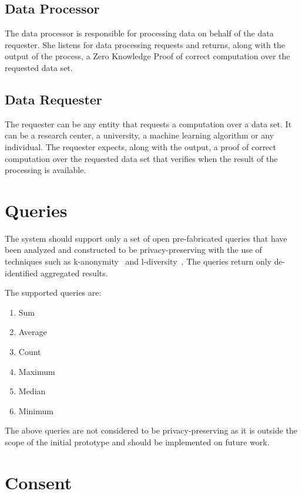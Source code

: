 \subsection{Data Processor}
\label{solution:entities:data_processor}

The data processor is responsible for processing data on behalf of the data requester. She listens
for data processing requests and returns, along with the output of the process, a Zero Knowledge Proof of correct computation over the requested data set.

\subsection{Data Requester}
\label{solution:entities:data_req}

The requester can be any entity that requests a computation over a data set. It can be a research center, a university, a machine learning algorithm or any individual. The requester expects, along with the output, a proof of correct computation over the requested data set that verifies when the result of the processing is available.

\section{Queries}
\label{solution:queries}

The system should support only a set of open pre-fabricated queries that have been analyzed and constructed to be privacy-preserving with the use of techniques such as k-anonymity~\cite{Samarati98protectingprivacy} and l-diversity~\cite{Aggarwal2008}. The queries return only de-identified aggregated results.

The supported queries are:

\begin{enumerate}
  \item Sum
  \item Average
  \item Count
  \item Maximum
  \item Median
  \item Minimum
\end{enumerate}

The above queries are not considered to be privacy-preserving as it is outside the scope of the initial prototype and should be implemented on future work.

\section{Consent}
\label{solution:consent}


